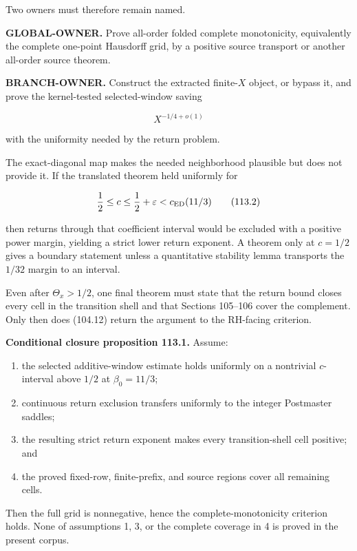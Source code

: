 \documentclass[
  11pt,
]{book}
\providecommand{\tightlist}{%
  \setlength{\itemsep}{0pt}\setlength{\parskip}{0pt}}
\renewenvironment{quote}
  {\begin{tcolorbox}[
      enhanced,
      breakable,
      colback=tncream,
      colframe=tnrust,
      boxrule=0.8pt,
      arc=1.5pt,
      left=7pt,
      right=7pt,
      top=6pt,
      bottom=6pt]}
  {\end{tcolorbox}}
\begin{document}
Two owners must therefore remain named.

\textbf{GLOBAL-OWNER.} Prove all-order folded complete monotonicity,
equivalently the complete one-point Hausdorff grid, by a positive source
transport or another all-order source theorem.

\textbf{BRANCH-OWNER.} Construct the extracted finite-\(X\) object, or
bypass it, and prove the kernel-tested selected-window saving

\[
X^{-1/4+o(1)}
\tag{113.1}
\]

with the uniformity needed by the return problem.

The exact-diagonal map makes the needed neighborhood plausible but does
not provide it. If the translated theorem held uniformly for

\[
\frac12\le c\le\frac12+\varepsilon
<c_{\rm ED}(11/3)
\tag{113.2}
\]

then returns through that coefficient interval would be excluded with a
positive power margin, yielding a strict lower return exponent. A
theorem only at \(c=1/2\) gives a boundary statement unless a
quantitative stability lemma transports the \(1/32\) margin to an
interval.

Even after \(\Theta_x>1/2\), one final theorem must state that the
return bound closes every cell in the transition shell and that Sections
105--106 cover the complement. Only then does (104.12) return the
argument to the RH-facing criterion.

\begin{quote}
\textbf{Conditional closure proposition 113.1.} Assume:

\begin{enumerate}
\def\labelenumi{\arabic{enumi}.}
\tightlist
\item
  the selected additive-window estimate holds uniformly on a nontrivial
  \(c\)-interval above \(1/2\) at \(\beta_0=11/3\);
\item
  continuous return exclusion transfers uniformly to the integer
  Postmaster saddles;
\item
  the resulting strict return exponent makes every transition-shell cell
  positive; and
\item
  the proved fixed-row, finite-prefix, and source regions cover all
  remaining cells.
\end{enumerate}

Then the full grid is nonnegative, hence the complete-monotonicity
criterion holds. None of assumptions 1, 3, or the complete coverage in 4
is proved in the present corpus.
\end{quote}
\end{document}
